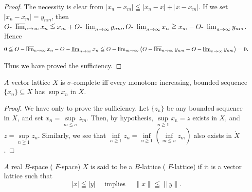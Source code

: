 \begin{proof}
 The necessity is clear from $|x_{n} - x_{m}| \leqq |x_{n} - x| + |x - x_{m}|$. If we set $|x_{n} - x_{m}| = y_{nm}$, then $O\text{- }\varlimsup\limits_{n \to \infty} x_{n} \leqq x_{m} + O\text{- }\varliminf\limits_{n \to \infty} y_{nm}, O\text{- }\varliminf\limits_{n \to \infty} x_{n} \geqq x_{m} - O\text{- }\varliminf\limits_{n \to \infty} y_{nm}$. Hence 
\[
0 \leqq O - \varlimsup\limits_{n \rightarrow \infty} x _{n} - O - \varliminf\limits_{n \rightarrow \infty} x _{n} \leqq O - \lim\limits _{m \rightarrow \infty} \left(O - \varlimsup\limits_{n \rightarrow \infty} y _{nm} - O - \varliminf\limits_{n \rightarrow \infty} y _{nm}\right) = 0. \]

Thus we have proved the sufficiency. 
\end{proof}

\begin{proposition}\label{prop:XII.2.Proposition.10} $A$ vector lattice $X$ is $\sigma$-complete iff every monotone increasing, bounded sequence $\{x_{n}\} \subseteq X$ has $\sup x_{n}$ in $X$. 
\end{proposition}

\begin{proof}
 We have only to prove the sufficiency. Let $\{z_n\}$ be any bounded sequence in $X$, and set $x_{n} = \sup\limits_{m\leqq n}z_{m}$. Then, by hypothesis, $\sup\limits_{n\geqq 1}x_{n} = z$ exists in $X$, and $z = \sup\limits_{n\geqq 1}z_{n}$. Similarly, we see that $\inf\limits_{n\geqq 1}z_n = \inf\limits_{n\geqq 1}\left(\inf\limits_{m\leqq n}z_m\right)$ also exists in $\dot{X}$. 
\end{proof}


\label{sec:XII.3}

\begin{definitionu} $A$ real $B$-space ( $F$-space) $X$ is said to be a $B$-lattice ( $F$-lattice) if it is a vector lattice such that 
\begin{equation}\label{eq:XII.3.1}
| x | \leqq | y | \quad \text{ implies } \quad \| x \| \leqq \| y \|.
\end{equation}
\end{definitionu}

